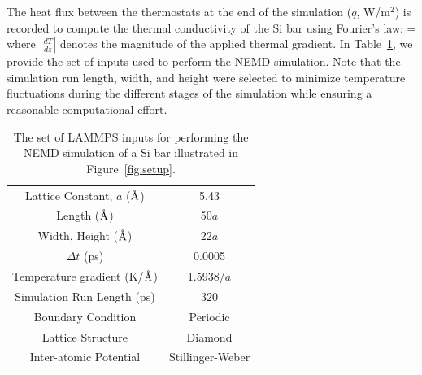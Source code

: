 %
The heat flux between the thermostats at the end of the simulation ($q$, W/m$^2$) is recorded to compute the
thermal conductivity of the Si bar using Fourier's law:
%
\be
 \kappa =  
\ee
%
where $\left|\frac{dT}{dz}\right|$ denotes the magnitude of the applied thermal gradient. In Table~\ref{tab:input},
we provide the set of inputs used to perform the NEMD simulation. Note that the simulation run length, width, 
and height were selected to minimize temperature fluctuations during the different stages of the simulation while
ensuring a reasonable computational effort. 
%
\begin{table}[htbp]
\centering
{}
\begin{tabular}{@{}cc@{}}\toprule
Lattice Constant, $a$ ($\mbox{\normalfont\AA}$) & 5.43 \\
Length ($\mbox{\normalfont\AA}$) & 50$a$ \\ 
Width, Height ($\mbox{\normalfont\AA}$) & 22$a$ \\
$\Delta t$  (ps) & 0.0005 \\ 
Temperature gradient (K/$\mbox{\normalfont\AA}$) & 1.5938/$a$ \\
Simulation Run Length (ps) & 320 \\ 
Boundary Condition & Periodic \\ 
Lattice Structure & Diamond \\
Inter-atomic Potential & Stillinger-Weber \\ 
\bottomrule
\end{tabular}
\caption{The set of LAMMPS inputs for performing the NEMD simulation of a Si bar illustrated in Figure~\ref{fig:setup}.}
\label{tab:input}
\end{table}
 
